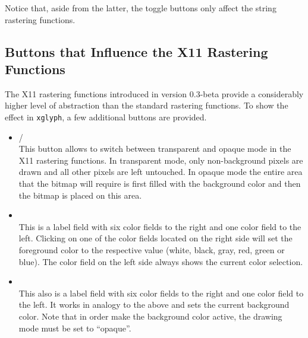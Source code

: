 Notice that, aside from the latter, the toggle buttons only affect the string
rastering functions.  

\subsection{Buttons that Influence the X11 Rastering Functions}
The X11 rastering functions introduced in version 0.3-beta provide a
considerably higher level of abstraction than the standard rastering
functions. To show the effect in \verb+xglyph+, a few additional buttons are
provided.  
\begin{itemize}
\item {}/\\ 
  This button allows to switch between transparent and opaque mode in the X11
  rastering functions. In transparent mode, only non-background pixels are
  drawn and all other pixels are left untouched. In opaque mode the entire
  area that the bitmap will require is first filled with the background color
  and then the bitmap is placed on this area.
\item {}\\
  This is a label field with six color fields to the right and one color field
  to the left. Clicking on one of the color fields located on the right side
  will set the foreground color to the respective value (white, black, gray,
  red, green or blue). The color field on the left side always shows the
  current color selection. 
\item {}\\
  This also is a label field with six color fields to the right and one color
  field to the left. It works in analogy to the above and sets the current
  background color. Note that in order make the background color active, the
  drawing mode must be set to ``opaque''.
\end{itemize}

